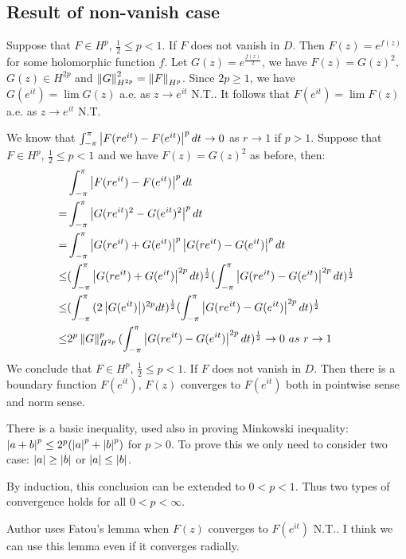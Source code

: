 \subsection{Result of non-vanish case}\label{non-vanish case}
Suppose that $F\in H^p$, $\frac{1}{2}\leq p<1$. If $F$ does not vanish in $D$. Then $F(z)=e^{f(z)}$ for some holomorphic function
$f$. Let $G(z)=e^{\frac{f(z)}{2}}$, we have $F(z)=G(z)^2$, $G(z)\in H^{2p}$ and $\left\lVert G\right\rVert^2_{H^{2p}}=\left\lVert F\right\rVert_{H^p}$. Since $2p\geq 1$, we have
$G(e^{it})=\lim{G(z)}$ a.e. as $z\to e^{it}$ N.T.. It follows that $F(e^{it})=\lim{F(z)}$ a.e. as $z\to e^{it}$ N.T.\par
We know that $\int_{-\pi}^{\pi}{\left\lvert F(re^{it})-F(e^{it})\right\rvert^p d t}\to 0$ as $r\to 1$ if $p>1$. Suppose that $F\in H^p$, $\frac{1}{2}\leq p<1$
and we have $F(z)=G(z)^2$ as before, then:
\begin{align*}
         & \int_{-\pi}^{\pi}{\left\lvert F(re^{it})-F(e^{it})\right\rvert^p d t}                                                                                        \\
    =    & \int_{-\pi}^{\pi}{\left\lvert G(re^{it})^2-G(e^{it})^2\right\rvert^p d t}                                                                                    \\
    =    & \int_{-\pi}^{\pi}{\left\lvert G(re^{it})+G(e^{it})\right\rvert^p\left\lvert G(re^{it})-G(e^{it})\right\rvert^p d t}                                                            \\
    \leq & (\int_{-\pi}^{\pi}{\left\lvert G(re^{it})+G(e^{it})\right\rvert^{2p}d t})^{\frac{1}{2}}(\int_{-\pi}^{\pi}{\left\lvert G(re^{it})-G(e^{it})\right\rvert^{2p}d t})^{\frac{1}{2}} \\
    \leq & (\int_{-\pi}^{\pi}{(2\left\lvert G(e^{it})\right\rvert)^{2p}d t})^{\frac{1}{2}}(\int_{-\pi}^{\pi}{\left\lvert G(re^{it})-G(e^{it})\right\rvert^{2p}d t})^{\frac{1}{2}}         \\
    \leq & 2^p\left\lVert G\right\rVert^p_{H^{2p}}(\int_{-\pi}^{\pi}{\left\lvert G(re^{it})-G(e^{it})\right\rvert^{2p}d t})^{\frac{1}{2}}\to 0 ~as ~r\to 1
\end{align*}
We conclude that $F\in H^p$, $\frac{1}{2}\leq p<1$. If $F$ does not vanish in $D$. Then there is a boundary function $F(e^{it})$, $F(z)$ converges
to $F(e^{it})$ both in pointwise sense and norm sense.\par
\begin{remark}
    There is a basic inequality, used also in proving Minkowski inequality: $\left\lvert a+b\right\rvert^p\leq 2^p(\left\lvert a\right\rvert^p+\left\lvert b\right\rvert^p)$ for $p>0$. To prove this we only need to consider two case: $\left\lvert a\right\rvert\geq\left\lvert b\right\rvert$
    or $\left\lvert a\right\rvert\leq\left\lvert b\right\rvert$.
\end{remark}
By induction, this conclusion can be extended to $0<p<1$. Thus two types of convergence holds for all $0<p<\infty$.
\begin{remark}
    {\color{blue} Author uses Fatou's lemma when $F(z)$ converges to $F(e^{it})$ N.T.. I think we can use this lemma even if it
        converges radially}.
\end{remark}
